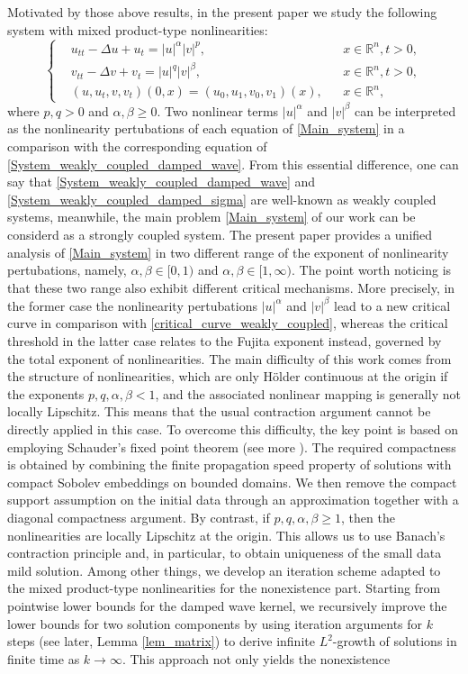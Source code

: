 \documentclass[11pt,reqno]{amsart}
\newcommand{\ity}{\infty}
\begin{document}
	Motivated by those above results, in the present paper we study the following system with mixed product-type nonlinearities:
	\begin{equation}\label{Main_system}
		\left\{
		\begin{aligned}
			&u_{tt}-\Delta u+u_t=|u|^{\alpha}|v|^p,&&x\in \mathbb{R}^n,t>0,\\
			&v_{tt}-\Delta v+v_t=|u|^{q}|v|^{\beta},&&x\in \mathbb{R}^n,t>0,\\
			&(u,u_t,v,v_t)(0,x)=(u_0,u_1,v_0,v_1)(x),&&x\in \mathbb{R}^n,
		\end{aligned}
		\right.
	\end{equation}
	where $p,q>0$ and $\alpha,\beta \ge 0$. Two nonlinear terms $|u|^{\alpha}$ and $|v|^{\beta}$ can be interpreted as the nonlinearity pertubations of each equation of \eqref{Main_system} in a comparison with the corresponding equation of \eqref{System_weakly_coupled_damped_wave}. From this essential difference, one can say that \eqref{System_weakly_coupled_damped_wave} and \eqref{System_weakly_coupled_damped_sigma} are well-known as weakly coupled systems, meanwhile, the main problem \eqref{Main_system} of our work can be considerd as a strongly coupled system. The present paper provides a unified analysis of \eqref{Main_system} in two different range of the exponent of nonlinearity pertubations, namely, $\alpha,\beta\in[0,1)$ and $\alpha,\beta\in[1,\infty)$. The point worth noticing is that these two range also exhibit different critical mechanisms. More precisely, in the former case the nonlinearity pertubations $|u|^{\alpha}$ and $|v|^{\beta}$ lead to a new critical curve in comparison with \eqref{critical_curve_weakly_coupled}, whereas the critical threshold in the latter case relates to the Fujita exponent instead, governed by the total exponent of nonlinearities. The main difficulty of this work comes from the structure of nonlinearities, which are only H\"older continuous at the origin if the exponents $p,q,\alpha,\beta<1$, and the associated nonlinear mapping is generally not locally Lipschitz. This means that the usual contraction argument cannot be directly applied in this case. To overcome this difficulty, the key point is based on employing Schauder's fixed point theorem (see more \cite{DrabekMilota,Evan}). The required compactness is obtained by combining the finite propagation speed property of solutions with compact Sobolev embeddings on bounded domains. We then remove the compact support assumption on the initial data through an approximation together with a diagonal compactness argument. By contrast, if $p,q,\alpha,\beta\geq 1$, then the nonlinearities are locally Lipschitz at the origin. This allows us to use Banach's contraction principle and, in particular, to obtain uniqueness of the small data mild solution. Among other things, we develop an iteration scheme adapted to the mixed product-type nonlinearities for the nonexistence part. Starting from pointwise lower bounds for the damped wave kernel, we recursively improve the lower bounds for two solution components by using iteration arguments for $k$ steps (see later, Lemma \ref{lem_matrix}) to derive infinite $L^2$-growth of solutions in finite time as $k\to \ity$. This approach not only yields the nonexistence 
\end{document}
